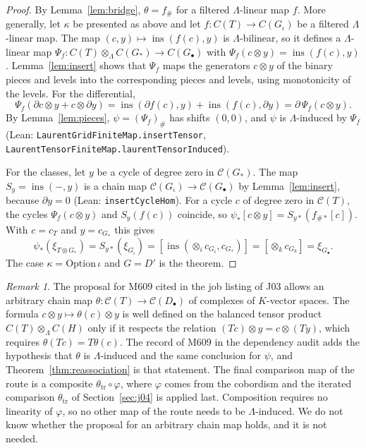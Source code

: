 \documentclass[11pt]{amsart}
\theoremstyle{definition}
\theoremstyle{remark}
\newtheorem{remark}[theorem]{Remark}
\newcommand{\lean}[1]{\textnormal{\nolinkurl{#1}}}
\newcommand{\Lam}{\Lambda}
\newcommand{\cC}{\mathcal{C}}
\newcommand{\ins}{\operatorname{ins}}
\begin{document}
\begin{proof}
By Lemma~\ref{lem:bridge}, $\theta=f_\#$ for a filtered $\Lam$-linear map $f$. More generally, let
$\kappa$ be presented as above and let $f\colon C(T)\to C(G_\iota)$ be a filtered $\Lam$-linear map.
The map $(c,y)\mapsto\ins(f(c),y)$ is $\Lam$-bilinear, so it defines a $\Lam$-linear map
$\Psi_f\colon C(T)\otimes_\Lam C(G_*)\to C(G_\bullet)$ with $\Psi_f(c\otimes y)=\ins(f(c),y)$.
Lemma~\ref{lem:insert} shows that $\Psi_f$ maps the generators $c\otimes y$ of the binary pieces and
levels into the corresponding pieces and levels, using monotonicity of the levels. For the
differential,
\[
\Psi_f(\partial c\otimes y+c\otimes\partial y)=\ins(\partial f(c),y)+\ins(f(c),\partial y)
=\partial\,\Psi_f(c\otimes y).
\]
By Lemma~\ref{lem:pieces}, $\psi=(\Psi_f)_\#$ has shifts $(0,0)$, and $\psi$ is $\Lam$-induced by
$\Psi_f$ (Lean: \lean{LaurentGridFiniteMap.insertTensor},
\lean{LaurentTensorFiniteMap.laurentTensorInduced}).

For the classes, let $y$ be a cycle of degree zero in $\cC(G_*)$. The map $S_y=\ins(-,y)$ is a
chain map $\cC(G_\iota)\to\cC(G_\bullet)$ by Lemma~\ref{lem:insert}, because $\partial y=0$ (Lean:
\lean{insertCycleHom}). For a cycle $c$ of degree zero in $\cC(T)$, the cycles
$\Psi_f(c\otimes y)$ and $S_y(f(c))$ coincide, so
$\psi_*[c\otimes y]=S_{y*}(f_{\#*}[c])$. With $c=c_T$ and $y=c_{G_*}$ this gives
\[
\psi_*(\xi_{T\otimes G_*})=S_{y*}(\xi_{G_\iota})=[\ins(\otimes_ic_{G_i},c_{G_*})]
=[\otimes_kc_{G_k}]=\xi_{G_\bullet}.
\]
The case $\kappa=\mathrm{Option}\,\iota$ and $G=D'$ is the theorem.
\end{proof}

\begin{remark}\label{rem:linear}
The proposal for M609 cited in the job listing of J03 allows an arbitrary chain map
$\theta\colon\cC(T)\to\cC(D_\bullet)$ of complexes of $K$-vector spaces. The formula
$c\otimes y\mapsto\theta(c)\otimes y$ is well defined on the balanced tensor product
$C(T)\otimes_\Lam C(H)$ only if it respects the relation $(Tc)\otimes y=c\otimes(Ty)$, which
requires $\theta(Tc)=T\theta(c)$. The record of M609 in the dependency audit adds the hypothesis
that $\theta$ is $\Lam$-induced and the same conclusion for $\psi$, and Theorem~\ref{thm:reassociation}
is that statement. The final comparison map of the route is a composite
$\theta_{\mathrm{tr}}\circ\varphi$, where $\varphi$ comes from the cobordism and the iterated
comparison $\theta_{\mathrm{tr}}$ of Section~\ref{sec:j04} is applied last. Composition requires no
linearity of $\varphi$, so no other map of the route needs to be $\Lam$-induced. We do not know whether the proposal for an arbitrary chain map holds,
and it is not needed.
\end{remark}
\end{document}

